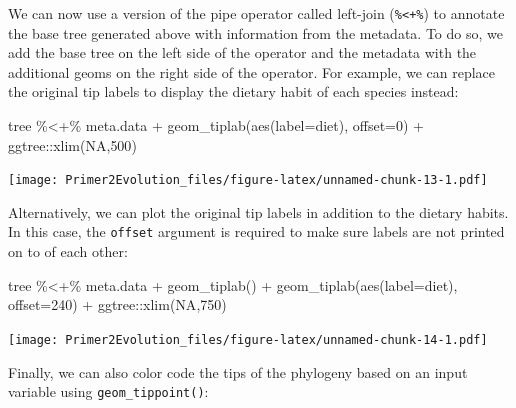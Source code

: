 \documentclass[
]{book}
\newenvironment{Shaded}{\begin{snugshade}}{\end{snugshade}}
\newcommand{\AttributeTok}[1]{\textcolor[rgb]{0.77,0.63,0.00}{#1}}
\newcommand{\ConstantTok}[1]{\textcolor[rgb]{0.00,0.00,0.00}{#1}}
\newcommand{\DecValTok}[1]{\textcolor[rgb]{0.00,0.00,0.81}{#1}}
\newcommand{\FunctionTok}[1]{\textcolor[rgb]{0.00,0.00,0.00}{#1}}
\newcommand{\NormalTok}[1]{#1}
\newcommand{\SpecialCharTok}[1]{\textcolor[rgb]{0.00,0.00,0.00}{#1}}
\begin{document}
We can now use a version of the pipe operator called left-join (\texttt{\%\textless{}+\%}) to annotate the base tree generated above with information from the metadata. To do so, we add the base tree on the left side of the operator and the metadata with the additional geoms on the right side of the operator. For example, we can replace the original tip labels to display the dietary habit of each species instead:

\begin{Shaded}
\begin{Highlighting}[]
\NormalTok{tree  }\SpecialCharTok{\%\textless{}+\%}\NormalTok{ meta.data }\SpecialCharTok{+} \FunctionTok{geom\_tiplab}\NormalTok{(}\FunctionTok{aes}\NormalTok{(}\AttributeTok{label=}\NormalTok{diet), }\AttributeTok{offset=}\DecValTok{0}\NormalTok{) }\SpecialCharTok{+}\NormalTok{ ggtree}\SpecialCharTok{::}\FunctionTok{xlim}\NormalTok{(}\ConstantTok{NA}\NormalTok{,}\DecValTok{500}\NormalTok{)}
\end{Highlighting}
\end{Shaded}

\texttt{[image: Primer2Evolution\_files/figure-latex/unnamed-chunk-13-1.pdf]}

Alternatively, we can plot the original tip labels in addition to the dietary habits. In this case, the \texttt{offset} argument is required to make sure labels are not printed on to of each other:

\begin{Shaded}
\begin{Highlighting}[]
\NormalTok{tree  }\SpecialCharTok{\%\textless{}+\%}\NormalTok{ meta.data }\SpecialCharTok{+} \FunctionTok{geom\_tiplab}\NormalTok{() }\SpecialCharTok{+} \FunctionTok{geom\_tiplab}\NormalTok{(}\FunctionTok{aes}\NormalTok{(}\AttributeTok{label=}\NormalTok{diet), }\AttributeTok{offset=}\DecValTok{240}\NormalTok{) }\SpecialCharTok{+}\NormalTok{ ggtree}\SpecialCharTok{::}\FunctionTok{xlim}\NormalTok{(}\ConstantTok{NA}\NormalTok{,}\DecValTok{750}\NormalTok{)}
\end{Highlighting}
\end{Shaded}

\texttt{[image: Primer2Evolution\_files/figure-latex/unnamed-chunk-14-1.pdf]}

Finally, we can also color code the tips of the phylogeny based on an input variable using \texttt{geom\_tippoint()}:
\end{document}
